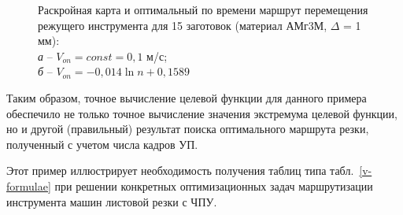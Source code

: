 \begin{figure}[H]
  \centering
  \caption{
    Раскройная карта и оптимальный по времени маршрут
    перемещения режущего инструмента для 15 заготовок
    (материал АМг3М, $\Delta$ = 1 мм): \\
    {\it а} -- $V_{on}=const=0,1$ м/с; \\
    {\it б} -- $V_{on}=-0,014 \ln n + 0,1589$
  }
  \label{amg-cutting+optimal}
\end{figure}

Таким образом,
точное вычисление целевой функции для
данного примера обеспечило не только
точное вычисление значения экстремума
целевой функции, но и другой (правильный)
результат поиска оптимального маршрута резки,
полученный  с учетом числа кадров УП.

Этот пример иллюстрирует необходимость
получения таблиц типа табл.~\ref{v-formulae}
при решении конкретных оптимизационных задач
маршрутизации инструмента машин листовой резки с ЧПУ.
